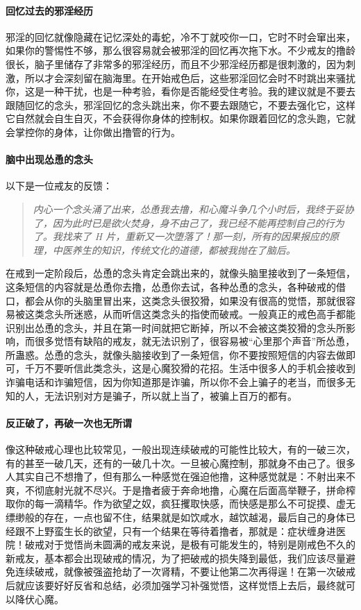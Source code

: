 \paragraph{回忆过去的邪淫经历}

邪淫的回忆就像隐藏在记忆深处的毒蛇，冷不丁就咬你一口，它时不时会窜出来，如果你的警惕性不够，那么很容易就会被邪淫的回忆再次拖下水。不少戒友的撸龄很长，脑子里储存了非常多的邪淫经历，而且不少邪淫经历都是很刺激的，因为刺激，所以才会深刻留在脑海里。在开始戒色后，这些邪淫回忆会时不时跳出来骚扰你，这是一种干扰，也是一种考验，看你是否能经受住考验。我的建议就是不要去跟随回忆的念头，邪淫回忆的念头跳出来，你不要去跟随它，不要去强化它，这样它自然就会自生自灭，不会获得你身体的控制权。如果你跟着回忆的念头跑，它就会掌控你的身体，让你做出撸管的行为。

\paragraph{脑中出现怂恿的念头}

以下是一位戒友的反馈：

\begin{quote}\it
    内心一个念头涌了出来，怂恿我去撸，和心魔斗争几个小时后，我终于妥协了，因为此时已是欲火焚身，身不由己了，我已经不能再控制自己的行为了。我找来了 H 片，重新又一次堕落了！那一刻，所有的因果报应的原理，中医养生的知识，传统文化的道德，都被我抛在了脑后。
\end{quote}

在戒到一定阶段后，怂恿的念头肯定会跳出来的，就像头脑里接收到了一条短信，这条短信的内容就是怂恿你去撸，怂恿你去试，各种怂恿的念头，各种破戒的借口，都会从你的头脑里冒出来，这类念头很狡猾，如果没有很高的觉悟，那就很容易被这类念头所迷惑，从而听信这类念头的指使而破戒。一般真正的戒色高手都能识别出怂恿的念头，并且在第一时间就把它断掉，所以不会被这类狡猾的念头所影响，而很多觉悟有缺陷的戒友，就无法识别了，很容易被“心里那个声音”所怂恿，所蛊惑。怂恿的念头，就像头脑接收到了一条短信，你不要按照短信的内容去做即可，千万不要听信此类念头，这是心魔狡猾的花招。生活中很多人的手机会接收到诈骗电话和诈骗短信，因为你知道那是诈骗，所以你不会上骗子的老当，而很多无知的人，无法识别对方是骗子，所以就上当了，被骗上百万的都有。

\paragraph{反正破了，再破一次也无所谓}

像这种破戒心理也比较常见，一般出现连续破戒的可能性比较大，有的一破三次，有的甚至一破几天，还有的一破几十次。一旦被心魔控制，那就身不由己了。很多人其实自己不想撸了，但有那么一种感觉在强迫他撸，这种感觉就是：不射出来不爽，不彻底射光就不尽兴。于是撸者疲于奔命地撸，心魔在后面高举鞭子，拼命榨取你的每一滴精华。作为欲望之奴，疯狂攫取快感，而快感是那么不可捉摸、虚无缥缈般的存在，一点也留不住，结果就是如饮咸水，越饮越渴，最后自己的身体已经跟不上野蛮生长的欲望，只有一个结果在等待着撸者，那就是：症状缠身进医院！破戒对于觉悟尚未圆满的戒友来说，是极有可能发生的，特别是刚戒色不久的新戒友，基本都会出现破戒的情况，为了把破戒的损失降到最低，我们应该尽量避免连续破戒，就像被强盗抢劫了一次肾精，不要让他第二次再得逞！在第一次破戒后就应该要好好反省和总结，必须加强学习补强觉悟，这样觉悟上去后，最终就可以降伏心魔。

